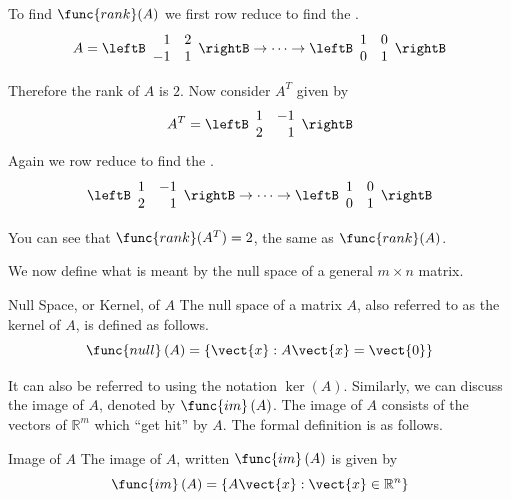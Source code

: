 \begin{solution}
To find $\func{rank}(A)$ we first row reduce to find the \rref.
\[
A = 
\leftB
\begin{array}{rr}
1 & 2 \\
-1 & 1 
\end{array} \rightB
\rightarrow \cdots \rightarrow
\leftB \begin{array}{rr}
1 & 0 \\
0 & 1 
\end{array}\rightB
\]

Therefore the rank of $A$ is $2$. Now consider $A^T$ given by 
\[
A^T = \leftB \begin{array}{rr}
1 & -1 \\
2 & 1 
\end{array} \rightB
\]
Again we row reduce to find the \rref.
\[
\leftB \begin{array}{rr}
1 & -1 \\
2 & 1 
\end{array} \rightB
\rightarrow \cdots \rightarrow
\leftB \begin{array}{rr}
1 & 0 \\
0 & 1 
\end{array} \rightB
\]

You can see that $\func{rank}(A^T) = 2$, the same as $\func{rank}(A)$. 
\end{solution}

We now define what is meant by the null space of a general $m\times n$ matrix.

\begin{definition}{Null Space, or Kernel, of $A$}\label{def:nullspace}
The null space of a matrix $A$, also referred to as the kernel of $A$, 
is defined as follows.  
 
\begin{equation*}
\func{null} \left( A\right) =\left\{ \vect{x} :A \vect{x} =\vect{0}\right\}
\end{equation*}
\end{definition}

It can also be referred to using the notation $\ker \left(
A\right) $. 
Similarly, we can discuss the image of $A$, denoted by
$\func{im}\left( A\right)$. The image of $A$ consists of the vectors
of $\mathbb{R}^{m}$ which ``get hit'' by $A$.  The formal definition
is as follows.

\begin{definition}{Image of $A$}\label{def:image}
The image of $A$, written $\func{im}\left( A\right)$ is given by
\[
\func{im}\left( A \right) = \left\{ A\vect{x} : \vect{x} \in \mathbb{R}^n \right\}
\]
\end{definition}

